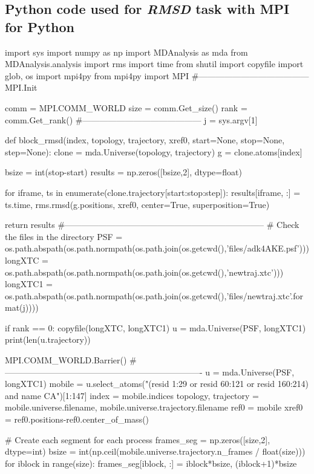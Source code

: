 \label{sec:codes}
\subsection{Python code used for \emph{RMSD} task with MPI for Python}
\label{sec:codeRMSD}

\begin{python}
import sys
import numpy as np
import MDAnalysis as mda
from MDAnalysis.analysis import rms
import time
from shutil import copyfile
import glob, os
import mpi4py
from mpi4py import MPI
#---------------------------------------
MPI.Init

comm = MPI.COMM_WORLD
size = comm.Get_size()
rank = comm.Get_rank()
#------------------------------------------
j = sys.argv[1]

def block_rmsd(index, topology, trajectory, xref0, start=None, stop=None, step=None):
    clone = mda.Universe(topology, trajectory)
    g = clone.atoms[index]

    bsize = int(stop-start)
    results = np.zeros([bsize,2], dtype=float)
  
    for iframe, ts in enumerate(clone.trajectory[start:stop:step]):
        results[iframe, :] = ts.time, rms.rmsd(g.positions, xref0, center=True, superposition=True)

    return results
#-----------------------------------------------------------------------
# Check the files in the directory
PSF = os.path.abspath(os.path.normpath(os.path.join(os.getcwd(),'files/adk4AKE.psf')))
longXTC = os.path.abspath(os.path.normpath(os.path.join(os.getcwd(),'newtraj.xtc')))
longXTC1 = os.path.abspath(os.path.normpath(os.path.join(os.getcwd(),'files/newtraj{}.xtc'.format(j))))

if rank == 0:
   copyfile(longXTC, longXTC1)
   u = mda.Universe(PSF, longXTC1)
   print(len(u.trajectory))

MPI.COMM_WORLD.Barrier()
#----------------------------------------------------------------------
u = mda.Universe(PSF, longXTC1)
mobile = u.select_atoms("(resid 1:29 or resid 60:121 or resid 160:214) and name CA")[1:147]
index = mobile.indices
topology, trajectory = mobile.universe.filename, mobile.universe.trajectory.filename
ref0 = mobile
xref0 = ref0.positions-ref0.center_of_mass()

# Create each segment for each process
frames_seg = np.zeros([size,2], dtype=int)
bsize = int(np.ceil(mobile.universe.trajectory.n_frames / float(size)))
for iblock in range(size):
    frames_seg[iblock, :] = iblock*bsize, (iblock+1)*bsize


\end{python}
